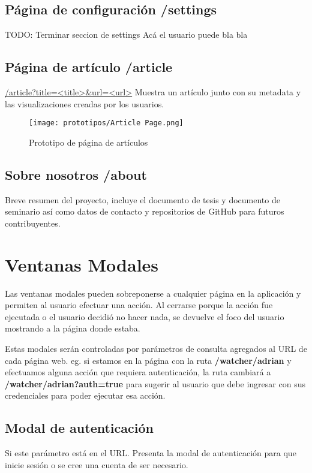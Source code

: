 \subsection{Página de configuración /settings}
TODO: Terminar seccion de settings
Acá el usuario puede bla bla

\subsection{Página de artículo /article}
\url{/article?title=<title>&url=<url>}
Muestra un artículo junto con su metadata y las visualizaciones creadas por los usuarios.

\begin{figure}[H]
    \centering
    \texttt{[image: prototipos/Article Page.png]}
    \caption{Prototipo de página de artículos}
    \label{PrototipoSettingsPage}
\end{figure}

\subsection{Sobre nosotros /about}
Breve resumen del proyecto, incluye el documento de tesis y documento de seminario así como datos de contacto y repositorios de GitHub para futuros contribuyentes.


\section{Ventanas Modales}
Las ventanas modales pueden sobreponerse a cualquier página en la aplicación y permiten al usuario efectuar una acción. Al cerrarse porque la acción fue ejecutada o el usuario decidió no hacer nada, se devuelve el foco del usuario mostrando a la página donde estaba.

Estas modales serán controladas por parámetros de consulta agregados al URL de cada página web. eg. si estamos en la página con la ruta \textbf{/watcher/adrian} y efectuamos alguna acción que requiera autenticación, la ruta cambiará a \textbf{/watcher/adrian?auth=true} para sugerir al usuario que debe ingresar con sus credenciales para poder ejecutar esa acción.

\subsection{Modal de autenticación}

Si este parámetro está en el URL. Presenta la modal de autenticación para que inicie sesión o se cree una cuenta de ser necesario.

